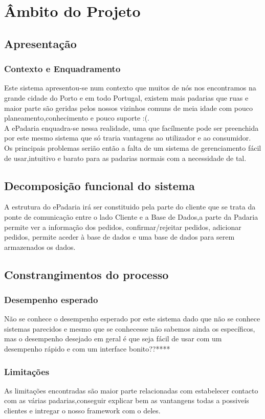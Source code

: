 \chapter{Âmbito do Projeto}
\label{ambito}
\section{Apresentação}
\subsection{Contexto e Enquadramento}
Este sistema apresentou-se num contexto que muitos de nós nos encontramos na grande cidade do Porto e em todo Portugal, existem mais padarias que ruas e maior parte são geridas pelos nossos vizinhos comuns de meia idade com pouco planeamento,conhecimento e pouco suporte :(.\\
A ePadaria enquadra-se nessa realidade, uma que facílmente pode ser preenchida por este mesmo sistema que só traria vantagens ao utilizador e ao consumidor.\\
Os principais problemas serião então a falta de um sistema de gerenciamento fácil de usar,intuitivo e barato para as padarias normais com a necessidade de tal.
\section{Decomposição funcional do sistema}
A estrutura do ePadaria irá ser constituido pela parte do cliente que se trata da ponte de comunicação entre o lado Cliente e a Base de Dados,a parte da Padaria permite ver a informação dos pedidos, confirmar/rejeitar pedidos, adicionar pedidos, permite aceder à base de dados e uma base de dados para serem armazenados os dados.
\section{Constrangimentos do processo}
\subsection{Desempenho esperado}
Não se conhece o desempenho esperado por este sistema dado que não se conhece sistemas parecidos e mesmo que se conhecesse não sabemos ainda os específicos, mas o desempenho desejado em geral é que seja fácil de usar com um desempenho rápido e com um interface bonito??****
\subsection{Limitações} 
As limitações encontradas são maior parte relacionadas com estabelecer contacto com as várias padarias,conseguir explicar bem as vantangens todas a possiveís clientes e intregar o nosso framework com o deles.
